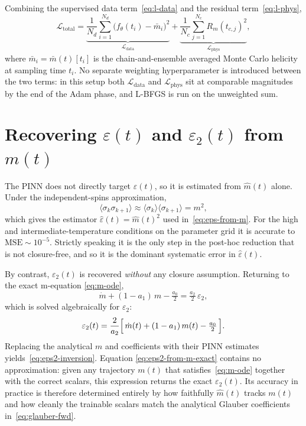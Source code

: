 \documentclass[conference]{IEEEtran}
\newcommand{\mt}{m(t)}
\newcommand{\mhat}{\hat m(t)}
\newcommand{\mbar}{\bar m(t)}
\newcommand{\eps}{\varepsilon}
\newcommand{\epstwo}{\varepsilon_2}
\begin{document}
Combining the supervised data term~\eqref{eq:l-data} and the residual
term~\eqref{eq:l-phys},
\begin{equation}
  \mathcal{L}_\text{total}
    = \underbrace{\frac{1}{N_d} \sum_{i=1}^{N_d}
        \bigl(f_\theta(t_i) - \bar m_i\bigr)^2}_{\mathcal{L}_\text{data}}
      + \underbrace{\frac{1}{N_c} \sum_{j=1}^{N_c}
        R_m(t_{c,j})^2}_{\mathcal{L}_\text{phys}},
  \label{eq:total-loss}
\end{equation}
where $\bar m_i = \mbar[t_i]$ is the chain-and-ensemble averaged
Monte Carlo helicity at sampling time $t_i$. No separate
weighting hyperparameter is introduced between the two terms: in
this setup both $\mathcal{L}_\text{data}$ and $\mathcal{L}_\text{phys}$
sit at comparable magnitudes by the end of the Adam phase, and
L-BFGS is run on the unweighted sum.

\section{Recovering $\eps(t)$ and $\epstwo(t)$ from $m(t)$}
\label{app:eps-recovery}


The PINN does not directly target $\eps(t)$, so it is estimated from
$\mhat$ alone. Under the independent-spins approximation,
\begin{equation}
  \langle \sigma_k \sigma_{k+1} \rangle
  \approx \langle \sigma_k \rangle \langle \sigma_{k+1} \rangle
  = m^2,
  \label{eq:eps-indep-spins}
\end{equation}
which gives the estimator $\hat\eps(t) = \mhat^2$ used
in~\eqref{eq:eps-from-m}. For the high and intermediate-temperature
conditions on the parameter grid it is accurate to $\mathrm{MSE} \sim 10^{-5}$.
Strictly speaking it is the only step in the post-hoc reduction that
is not closure-free, and so it is the dominant systematic error in
$\hat\eps(t)$.


By contrast, $\epstwo(t)$ is recovered \emph{without} any
closure assumption. Returning to the exact m-equation
\eqref{eq:m-ode},
\begin{equation}
  \dot m + (1 - a_1)\,m - \tfrac{a_0}{2}
    = \tfrac{a_2}{2}\,\epstwo,
\end{equation}
which is solved algebraically for $\epstwo$:
\begin{equation}
  \epstwo(t)
    = \frac{2}{a_2}\Bigl[\,\dot m(t) + (1 - a_1)\,m(t) - \tfrac{a_0}{2}\,\Bigr].
  \label{eq:eps2-from-m-exact}
\end{equation}
Replacing the analytical $m$ and coefficients with their PINN
estimates yields~\eqref{eq:eps2-inversion}. Equation
\eqref{eq:eps2-from-m-exact} contains no approximation: given any
trajectory $m(t)$ that satisfies~\eqref{eq:m-ode} together with the
correct scalars, this expression returns the exact $\epstwo(t)$.
Its accuracy in practice is therefore determined entirely by how
faithfully $\mhat$ tracks $\mt$ and how cleanly the trainable scalars
match the analytical Glauber coefficients in~\eqref{eq:glauber-fwd}.
\end{document}
